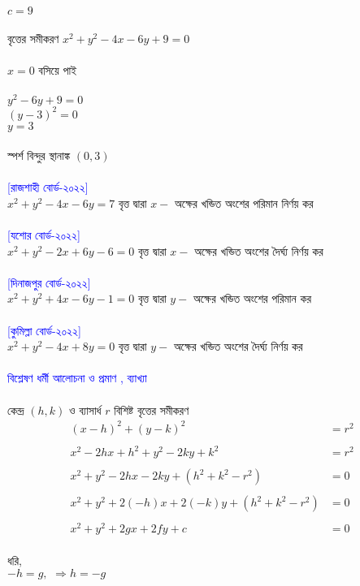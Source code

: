 \documentclass{article}
\begin{document}
$c=9$\\
\\
বৃত্তের সমীকরণ  $x^2+y^2-4x-6y+9=0$\\
\\
$x=0$ বসিয়ে পাই \\
\\ 
$y^2-6y+9=0$\\
$(y-3)^2=0$\\
$y=3$\\ 
\\
স্পর্শ বিন্দুর স্থানাঙ্ক $(0,3)$\\
\\ 
\textcolor{blue}{[রাজশাহী বোর্ড-২০২২]}\\
$x^2+y^2-4x-6y=7$ বৃত্ত দ্বারা $x-$  অক্ষের খন্ডিত অংশের পরিমান নির্ণয়  কর \\ 
\\
\textcolor{blue}{[যশোর বোর্ড-২০২২]}\\
$x^2+y^2-2x+6y-6=0$ বৃত্ত দ্বারা $x-$  অক্ষের খন্ডিত অংশের দৈর্ঘ্য নির্ণয়  কর \\ 
\\
\textcolor{blue}{[দিনাজপুর বোর্ড-২০২২]}\\
$x^2+y^2+4x-6y-1=0$ বৃত্ত দ্বারা $y-$  অক্ষের খন্ডিত অংশের পরিমান  কর \\ 
\\
\textcolor{blue}{[কুমিল্লা বোর্ড-২০২২]}\\
$x^2+y^2-4x+8y=0$ বৃত্ত দ্বারা $y-$  অক্ষের খন্ডিত অংশের দৈর্ঘ্য নির্ণয়  কর \\ 
\\
\textcolor{blue}{বিশ্লেষণ ধর্মী আলোচনা ও প্রমাণ , ব্যাখ্যা }\\ 
\\
	কেন্দ্র $(h,k)$  ও ব্যাসার্ধ $r$ বিশিষ্ট বৃত্তের সমীকরণ \\ 
\begin{align*}
	(x-h)^2+(y-k)^2&=r^2\\
	\\
	x^2-2hx+h^2+y^2-2ky+k^2&=r^2\\
	\\
	x^2+y^2-2hx-2ky+(h^2+k^2-r^2)&=0\\
	\\
	x^2+y^2+2(-h)x+2(-k)y+(h^2+k^2-r^2)&=0\\
	\\
	x^2+y^2+2gx+2fy+c&=0
\end{align*}
\\
ধরি,\\ 
$-h=g,\,\,\Rightarrow h=-g$\\
\end{document}
